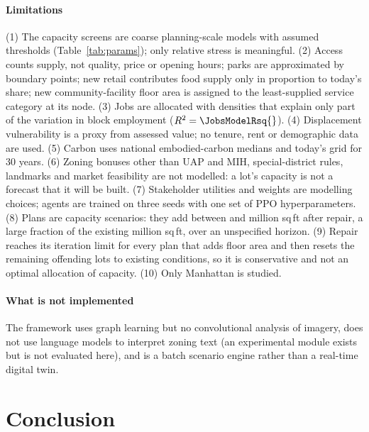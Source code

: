 \documentclass[preprint,12pt]{elsarticle}
\begin{document}
\paragraph{Limitations}
(1) The capacity screens are coarse planning-scale models with assumed thresholds (Table~\ref{tab:params}); only relative stress is meaningful. (2) Access counts supply, not quality, price or opening hours; parks are approximated by boundary points; new retail contributes food supply only in proportion to today's share; new community-facility floor area is assigned to the least-supplied service category at its node. (3) Jobs are allocated with densities that explain only part of the variation in block employment ($R^2=\JobsModelRsq{}$). (4) Displacement vulnerability is a proxy from assessed value; no tenure, rent or demographic data are used. (5) Carbon uses national embodied-carbon medians and today's grid for 30 years. (6) Zoning bonuses other than UAP and MIH, special-district rules, landmarks and market feasibility are not modelled: a lot's capacity is not a forecast that it will be built. (7) Stakeholder utilities and weights are modelling choices; agents are trained on three seeds with one set of PPO hyperparameters. (8) Plans are capacity scenarios: they add between \RandFAMVer{} and \BoUapFAMVer{} million sq\,ft after repair, a large fraction of the existing \ExistingFAM{} million sq\,ft, over an unspecified horizon. (9) Repair reaches its iteration limit for every plan that adds floor area and then resets the remaining offending lots to existing conditions, so it is conservative and not an optimal allocation of capacity. (10) Only Manhattan is studied.

\paragraph{What is not implemented} The framework uses graph learning but no convolutional analysis of imagery, does not use language models to interpret zoning text (an experimental module exists but is not evaluated here), and is a batch scenario engine rather than a real-time digital twin.

\section{Conclusion}
\end{document}
